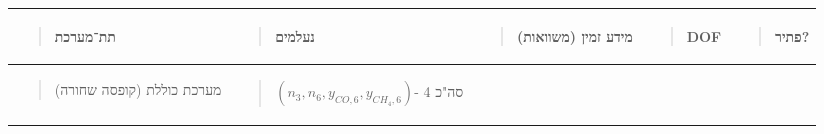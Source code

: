 \documentclass[
  hebrew,
  letterpaper,
  DIV=11,
  numbers=noendperiod]{scrreprt}
\begin{document}
\begin{longtable}[]{@{}
  >{\raggedright\arraybackslash}p{}
  >{\raggedright\arraybackslash}p{}
  >{\raggedright\arraybackslash}p{}
  >{\raggedright\arraybackslash}p{}
  >{\raggedright\arraybackslash}p{}@{}}
\toprule\noalign{}
\begin{minipage}[b]{\linewidth}\raggedright
\begin{quote}
\textbf{תת־מערכת}
\end{quote}
\end{minipage} & \begin{minipage}[b]{\linewidth}\raggedright
\begin{quote}
\textbf{נעלמים}
\end{quote}
\end{minipage} & \begin{minipage}[b]{\linewidth}\raggedright
\begin{quote}
\textbf{מידע זמין (משוואות)}
\end{quote}
\end{minipage} & \begin{minipage}[b]{\linewidth}\raggedright
\begin{quote}
\textbf{DOF}
\end{quote}
\end{minipage} & \begin{minipage}[b]{\linewidth}\raggedright
\begin{quote}
\textbf{פתיר?}
\end{quote}
\end{minipage} \\
\midrule\noalign{}
\endhead
\bottomrule\noalign{}
\endlastfoot
\begin{minipage}[t]{\linewidth}\raggedright
\begin{quote}
מערכת כוללת (קופסה שחורה)
\end{quote}
\end{minipage} & \begin{minipage}[t]{\linewidth}\raggedright
\begin{quote}
\(\left( n_{3},n_{6},y_{CO,6},y_{CH_{4},6} \right)\)- סה"כ 4
\end{quote}
\end{minipage} & \begin{minipage}[t]{\linewidth}\raggedright
\begin{quote}

\end{quote}
\end{minipage}
\end{longtable}
\end{document}
